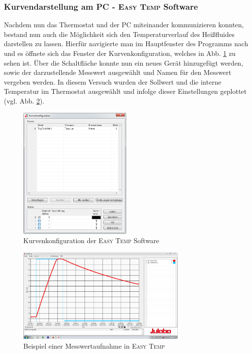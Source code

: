 \documentclass[a4paper, 11pt, draft=false]{scrartcl}
\begin{document}
	\subsubsection*{Kurvendarstellung am PC - \textsc{Easy Temp} Software}
	Nachdem nun das Thermostat und der PC miteinander kommunizieren konnten, bestand nun auch die Möglichkeit sich den Temperaturverlauf des Heißfluides darstellen zu lassen. Hierfür navigierte man im Hauptfenster des Programms nach  und es öffnete sich das Fenster der Kurvenkonfiguration, welches in Abb. \ref{fig:kurvenkonfig} zu sehen ist. Über die Schaltfläche  konnte nun ein neues Gerät hinzugefügt werden, sowie der darzustellende Messwert ausgewählt und Namen für den Messwert vergeben werden. In diesem Versuch wurden der Sollwert und die interne Temperatur im Thermostat ausgewählt und infolge dieser Einstellungen geplottet (vgl. Abb. \ref{fig:beispiel_plot}).
	
	\begin{figure}[h!]
		\centering
		\includegraphics[width=0.5\textwidth]{img/julabo_3}
		\caption{Kurvenkonfiguration der \textsc{Easy Temp} Software}
		\label{fig:kurvenkonfig}
	\end{figure}
	\FloatBarrier
	
	\begin{figure}[h!]
		\centering
		\includegraphics[width=0.75\textwidth]{img/julabo_4}
		\caption{Beispiel einer Messwertaufnahme in \textsc{Easy Temp}}
		\label{fig:beispiel_plot}
	\end{figure}
	\FloatBarrier
	
\end{document}

